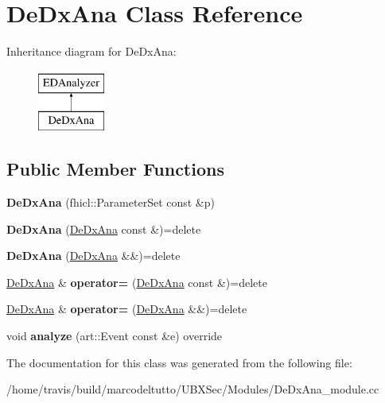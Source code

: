 \hypertarget{classDeDxAna}{\section{De\-Dx\-Ana Class Reference}
\label{classDeDxAna}
}
Inheritance diagram for De\-Dx\-Ana\-:\begin{figure}[H]
\begin{center}
\leavevmode
\includegraphics[height=2.000000cm]{classDeDxAna}
\end{center}
\end{figure}
\subsection*{Public Member Functions}
\begin{DoxyCompactItemize}
\item 
\hypertarget{classDeDxAna_aafa017bdd99fff476da1a0fc5ea67722}{{\bfseries De\-Dx\-Ana} (fhicl\-::\-Parameter\-Set const \&p)}\label{classDeDxAna_aafa017bdd99fff476da1a0fc5ea67722}

\item 
\hypertarget{classDeDxAna_a7a0e448252c3a8a85dbedd88b9acde41}{{\bfseries De\-Dx\-Ana} (\hyperlink{classDeDxAna}{De\-Dx\-Ana} const \&)=delete}\label{classDeDxAna_a7a0e448252c3a8a85dbedd88b9acde41}

\item 
\hypertarget{classDeDxAna_a9bd2425ac117a5502b146e79688042b6}{{\bfseries De\-Dx\-Ana} (\hyperlink{classDeDxAna}{De\-Dx\-Ana} \&\&)=delete}\label{classDeDxAna_a9bd2425ac117a5502b146e79688042b6}

\item 
\hypertarget{classDeDxAna_a2168024a40002cf6b3b4aa25df99faa4}{\hyperlink{classDeDxAna}{De\-Dx\-Ana} \& {\bfseries operator=} (\hyperlink{classDeDxAna}{De\-Dx\-Ana} const \&)=delete}\label{classDeDxAna_a2168024a40002cf6b3b4aa25df99faa4}

\item 
\hypertarget{classDeDxAna_a3b71a1570272d521eabef8d7468eac82}{\hyperlink{classDeDxAna}{De\-Dx\-Ana} \& {\bfseries operator=} (\hyperlink{classDeDxAna}{De\-Dx\-Ana} \&\&)=delete}\label{classDeDxAna_a3b71a1570272d521eabef8d7468eac82}

\item 
\hypertarget{classDeDxAna_a997e03e16044d2e5c8603cc6578c43c3}{void {\bfseries analyze} (art\-::\-Event const \&e) override}\label{classDeDxAna_a997e03e16044d2e5c8603cc6578c43c3}

\end{DoxyCompactItemize}


The documentation for this class was generated from the following file\-:\begin{DoxyCompactItemize}
\item 
/home/travis/build/marcodeltutto/\-U\-B\-X\-Sec/\-Modules/De\-Dx\-Ana\-\_\-module.\-cc\end{DoxyCompactItemize}
